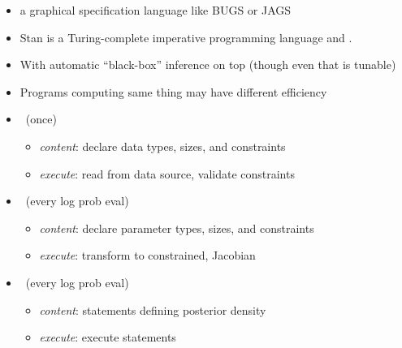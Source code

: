 \documentclass[10pt]{report}
\begin{document}


%
\begin{itemize}
\item {} a graphical specification language like BUGS or JAGS
\item Stan is a Turing-complete imperative programming language  and .
\item With automatic ``black-box'' inference on top (though even that is tunable)
\item Programs computing same thing may have different efficiency
\end{itemize}


%
\begin{itemize}
\item {} \ (once)
  \vspace*{-4pt}
  \begin{itemize}\small
  \item {\slshape content}: declare data types, sizes, and constraints
  \item {\slshape execute}: read from data source, validate constraints
  \end{itemize}
\item {} \ (every log prob eval)
  \vspace*{-4pt}
  \begin{itemize}\small
  \item {\slshape content}: declare parameter types, sizes, and constraints
  \item {\slshape execute}: transform to constrained, Jacobian
  \end{itemize}
\item {} \ (every log prob eval)
  \vspace*{-4pt}
  \begin{itemize}\small
  \item {\slshape content}: statements defining posterior density
  \item {\slshape execute}: execute statements
  \end{itemize}
\end{itemize}
\end{document}

